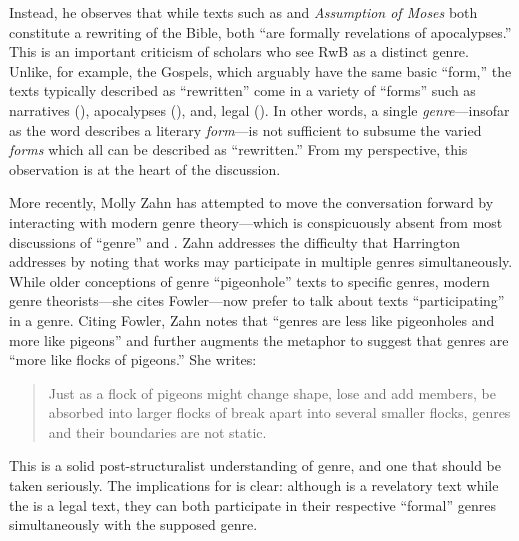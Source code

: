  Instead, he observes that while texts such as \jub and \emph{Assumption of Moses} both constitute a rewriting of the Bible, both ``are formally revelations of apocalypses.''\autocite[243]{harrington_kraft-nickelsburg1986} This is an important criticism of scholars who see RwB as a distinct genre. Unlike, for example, the Gospels, which arguably have the same basic ``form,'' the texts typically described as ``rewritten'' come in a variety of ``forms'' such as narratives (\ga), apocalypses (\jub), and, legal (\templescroll). In other words, a single \emph{genre}---insofar as the word describes a literary \emph{form}---is not sufficient to subsume the varied \emph{forms} which all can be described as ``rewritten.'' From my perspective, this observation is at the heart of the discussion. 

 More recently, Molly Zahn has attempted to move the conversation forward by interacting with modern genre theory---which is conspicuously absent from most discussions of ``genre'' and \rwb.\autocites{zahn_jbl2012}[Daniel Machiela noted the absence of genre theory in his 2010 article, as well, see][]{machiela_jjs2010}[Notable exceptions include][]{brooke_dsd2010} Zahn addresses the difficulty that Harrington addresses by noting that works may participate in multiple genres simultaneously. While older conceptions of genre ``pigeonhole'' texts to specific genres, modern genre theorists---she cites Fowler---now prefer to talk about texts ``participating'' in a genre. Citing Fowler, Zahn notes that ``genres are less like pigeonholes and more like pigeons'' and further augments the metaphor to suggest that genres are ``more like flocks of pigeons.'' She writes: 

 \begin{quote} Just as a flock of pigeons might change shape, lose and add members, be absorbed into larger flocks of break apart into several smaller flocks, genres and their boundaries are not static.\autocite[277]{zahn_jbl2012} \end{quote} 

 This is a solid post-structuralist understanding of genre, and one that should be taken seriously. The implications for \rwb is clear: although \jub is a revelatory text while the \templescroll is a legal text, they can both participate in their respective ``formal'' genres simultaneously with the supposed \rwb genre.\autocites[Zahn also explores the ``functional'' aspects of genre. She notes that genres are ``not simply systems of classifications developed and used by literary critics, but are fundamental to all human communication.''][280]{zahn_jbl2012}[Thus, genres manifest as common patterns recognized by both the author and the reader which aid communication and in this way, genre functions as a sort of ``literary body language.''][276]{zahn_jbl2012}[See also][199]{newsom_grossman2010} 

